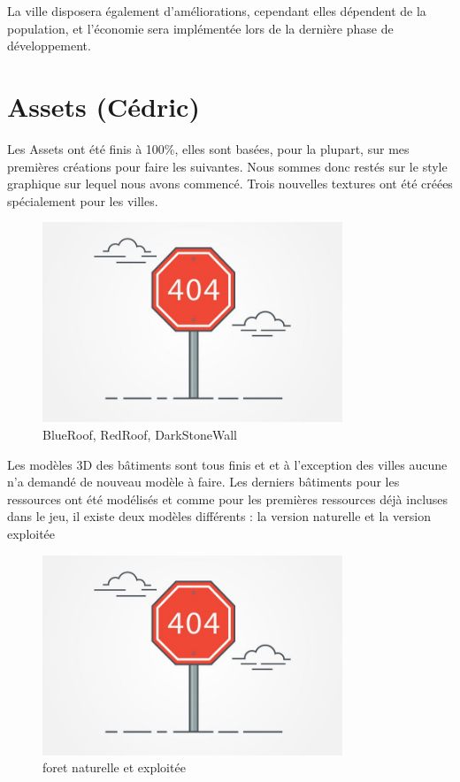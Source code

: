 \documentclass[12pt]{report}
\begin{document}
La ville disposera également d’améliorations, cependant elles dépendent de la population, et l’économie sera implémentée lors de la dernière phase de développement.

\section{Assets (Cédric)}

Les Assets ont été finis à 100\%, elles sont basées, pour la plupart, sur mes premières créations pour faire les suivantes. Nous sommes donc restés sur le style graphique sur lequel nous avons commencé. Trois nouvelles textures ont été créées  spécialement pour les villes.

\begin{figure}[H]
    \centering
    \includegraphics[width=0.8\textwidth]{404}
    \caption{BlueRoof, RedRoof, DarkStoneWall}
\end{figure}

Les modèles 3D des bâtiments sont tous finis et et à l’exception des villes aucune n’a demandé de nouveau modèle à faire. Les derniers bâtiments pour les ressources ont été modélisés et comme pour les premières ressources déjà incluses dans le jeu, il existe deux modèles différents : la version naturelle et la version exploitée 

\begin{figure}[H]
    \centering
    \includegraphics[width=0.8\textwidth]{404}
    \caption{foret naturelle et exploitée}
\end{figure}
\end{document}
